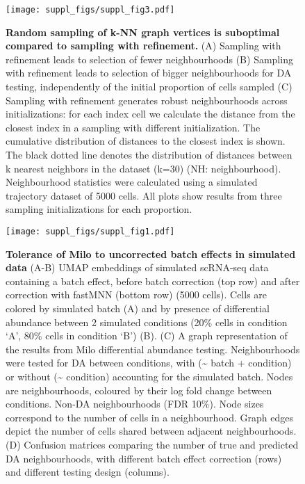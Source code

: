 \documentclass[
]{article}
\author{}
\date{\vspace{-2.5em}}
\begin{document}
\renewcommand{\figurename}{Supplementary Figure}

\newpage

\begin{figure}
\centering
\texttt{[image: suppl\_figs/suppl\_fig3.pdf]}
\caption{\label{fig:sup-fig-3}\textbf{Random sampling of k-NN graph vertices is suboptimal compared to sampling with refinement.}
(A) Sampling with refinement leads to selection of fewer neighbourhoods
(B) Sampling with refinement leads to selection of bigger neighbourhoods for DA testing, independently of the initial proportion of cells sampled
(C) Sampling with refinement generates robust neighbourhoods across initializations: for each index cell we calculate the distance from the closest index in a sampling with different initialization. The cumulative distribution of distances to the closest index is shown. The black dotted line denotes the distribution of distances between k nearest neighbors in the dataset (k=30) (NH: neighbourhood).
Neighbourhood statistics were calculated using a simulated trajectory dataset of 5000 cells. All plots show results from three sampling initializations for each proportion.}
\end{figure}







\begin{figure}
\centering
\texttt{[image: suppl\_figs/suppl\_fig1.pdf]}
\caption{\label{fig:sup-fig-1}\textbf{Tolerance of Milo to uncorrected batch effects in simulated data}
(A-B) UMAP embeddings of simulated scRNA-seq data containing a batch effect, before batch correction (top row) and after correction with fastMNN (bottom row) (5000 cells). Cells are colored by simulated batch (A) and by presence of differential abundance between 2 simulated conditions (20\% cells in condition `A', 80\% cells in condition `B') (B).
(C) A graph representation of the results from Milo differential abundance testing. Neighbourhoods were tested for DA between conditions, with (\textasciitilde{} batch + condition) or without (\textasciitilde{} condition) accounting for the simulated batch. Nodes are neighbourhoods, coloured by their log fold change between conditions. Non-DA neighbourhoods (FDR 10\%). Node sizes correspond to the number of cells in a neighbourhood. Graph edges depict the number of cells shared between adjacent neighbourhoods.
(D) Confusion matrices comparing the number of true and predicted DA neighbourhoods, with different batch effect correction (rows) and different testing design (columns).}
\end{figure}
\end{document}
